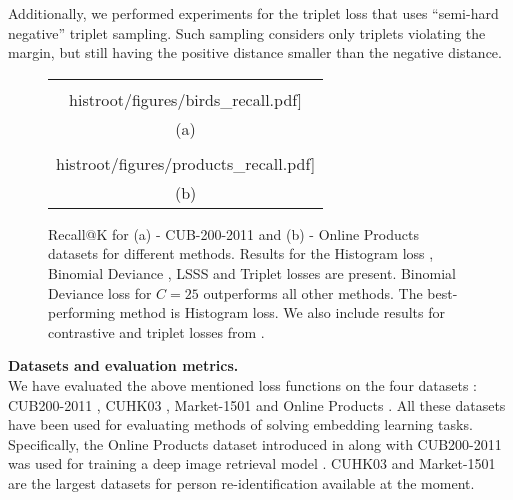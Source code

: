 Additionally, we performed experiments for the triplet loss \citep{SchroffKP15} that uses ``semi-hard negative'' triplet sampling. Such sampling considers only triplets violating the margin, but still having the positive distance smaller than the negative distance.


\begin{figure}
\begin{center}
\begin{tabular}{c}

        \texttt{[image: \\histroot/figures/birds\_recall.pdf]}\\
        (a)\\


        \texttt{[image: \\histroot/figures/products\_recall.pdf]}\\
        (b)\\
\end{tabular}
    \caption{Recall@K for (a) - CUB-200-2011 and (b) - Online Products datasets for different methods. Results for the Histogram loss , Binomial Deviance , LSSS  \citep{Song16} and Triplet  \citep{SchroffKP15} losses are present. Binomial Deviance loss for $C=25$ outperforms all other methods. The best-performing method is Histogram loss. We also include results for contrastive and triplet losses from \citep{Song16}.
    }
    \label{fig:birds_products}
\end{center}
\end{figure}


\noindent\textbf{Datasets and evaluation metrics.}\\
We have evaluated the above mentioned loss functions on the four datasets : CUB200-2011 \citep{Wah11}, CUHK03 \citep{Li14}, Market-1501 \citep{Zheng15} and Online Products \citep{Song16}. All these datasets have been used for evaluating methods of solving embedding learning tasks. 
Specifically, the Online Products dataset introduced in \citep{Song16} along with CUB200-2011 was used for training a deep image retrieval model \citep{Song16}. CUHK03 and  Market-1501 are the largest datasets for person re-identification available at the moment. 

